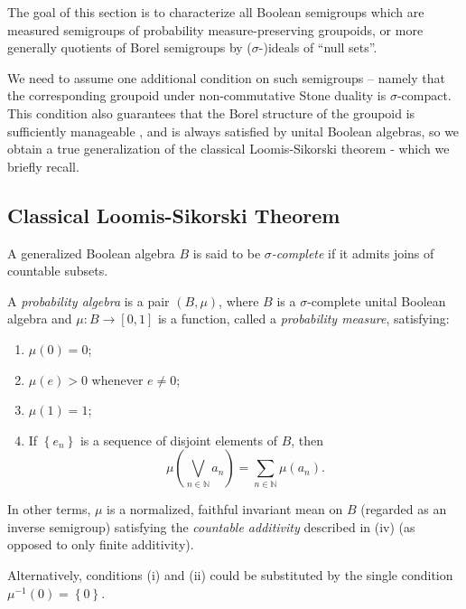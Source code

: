 %

%

The goal of this section is to characterize all Boolean semigroups which are measured semigroups of probability measure-preserving groupoids, or more generally quotients of Borel semigroups by ($\sigma$-)ideals of ``null sets''.

We need to assume one additional condition on such semigroups -- namely that the corresponding groupoid under non-commutative Stone duality is $\sigma$-compact. This condition also guarantees that the Borel structure of the groupoid is sufficiently manageable , and is always satisfied by unital Boolean algebras, so we obtain a true generalization of the classical Loomis-Sikorski theorem - which we briefly recall.

\subsection{Classical Loomis-Sikorski Theorem}

\begin{definition}[{\cite[314A]{MR2459668}}]
A generalized Boolean algebra $B$ is said to be \emph{$\sigma$-complete} if it admits joins of countable subsets.
\end{definition}

\begin{definition}[{\cite[322A]{MR2459668}}]\label{definitionprobabilityalgebra}
A \emph{probability algebra} is a pair $(B,\mu)$, where $B$ is a $\sigma$-complete unital Boolean algebra and $\mu:B\to[0,1]$ is a function, called a \emph{probability measure}, satisfying:
\begin{enumerate}
\item[(i)] $\mu(0)=0$;
\item[(ii)] $\mu(e)>0$ whenever $e\neq 0$;
\item[(iii)] $\mu(1)=1$;
\item[(iv)] If $\left\{e_n\right\}$ is a sequence of disjoint elements of $B$, then
\[\mu\left(\bigvee_{n\in\mathbb{N}} a_n\right)=\sum_{n\in\mathbb{N}}\mu(a_n).\]
\end{enumerate}
In other terms, $\mu$ is a normalized, faithful invariant mean on $B$ (regarded as an inverse semigroup) satisfying the \emph{countable additivity} described in (iv) (as opposed to only finite additivity).
\end{definition}

Alternatively, conditions (i) and (ii) could be substituted by the single condition $\mu^{-1}(0)=\left\{0\right\}$.

